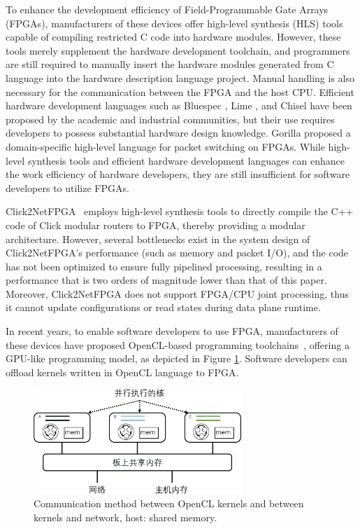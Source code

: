 To enhance the development efficiency of Field-Programmable Gate Arrays (FPGAs), manufacturers of these devices offer high-level synthesis (HLS) tools~\cite{vivado,intel-hls} capable of compiling restricted C code into hardware modules. However, these tools merely supplement the hardware development toolchain, and programmers are still required to manually insert the hardware modules generated from C language into the hardware description language project. Manual handling is also necessary for the communication between the FPGA and the host CPU. Efficient hardware development languages such as Bluespec \cite{bluespec}, Lime \cite{auerbach2010lime}, and Chisel \cite{bachrach2012chisel} \cite{bacon2013fpga,singh2011implementing,wester2015transformation} have been proposed by the academic and industrial communities, but their use requires developers to possess substantial hardware design knowledge. Gorilla \cite{lavasani2012compiling} proposed a domain-specific high-level language for packet switching on FPGAs. While high-level synthesis tools and efficient hardware development languages can enhance the work efficiency of hardware developers, they are still insufficient for software developers to utilize FPGAs.

Click2NetFPGA~\cite {Click2NetFPGA} employs high-level synthesis tools to directly compile the C++ code of Click modular routers \cite {kohler2000click} to FPGA, thereby providing a modular architecture. However, several bottlenecks exist in the system design of Click2NetFPGA's performance (such as memory and packet I/O), and the code has not been optimized to ensure fully pipelined processing, resulting in a performance that is two orders of magnitude lower than that of this paper. Moreover, Click2NetFPGA does not support FPGA/CPU joint processing, thus it cannot update configurations or read states during data plane runtime.

In recent years, to enable software developers to use FPGA, manufacturers of these devices have proposed OpenCL-based programming toolchains~\cite{aoc,sdaccel}, offering a GPU-like programming model, as depicted in Figure \ref{intro:fig:opencl}. Software developers can offload kernels written in OpenCL language to FPGA.

\begin{figure}[htbp]
	\centering
	\includegraphics[width=0.7\textwidth]{../figures/opencl.pdf}
	\caption{Communication method between OpenCL kernels and between kernels and network, host: shared memory.}
	\label{intro:fig:opencl}
\end{figure}

